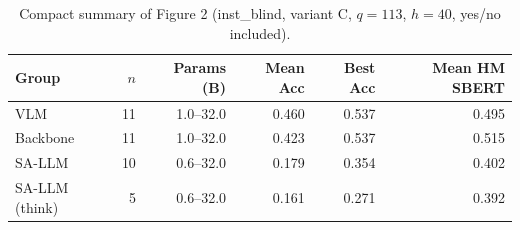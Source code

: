 \begin{table}[t]
\centering
\caption{Compact summary of Figure 2 (inst\_blind, variant C, $q=113$, $h=40$, yes/no included).}
\label{tab:fig2_scale_group_summary}
\small
\setlength{\tabcolsep}{4pt}
\begin{tabular}{lrrrrr}
\toprule
Group & $n$ & Params (B) & Mean Acc & Best Acc & Mean HM SBERT \\
\midrule
VLM & 11 & 1.0--32.0 & 0.460 & 0.537 & 0.495 \\
Backbone & 11 & 1.0--32.0 & 0.423 & 0.537 & 0.515 \\
SA-LLM & 10 & 0.6--32.0 & 0.179 & 0.354 & 0.402 \\
SA-LLM (think) & 5 & 0.6--32.0 & 0.161 & 0.271 & 0.392 \\
\bottomrule
\end{tabular}
\end{table}
